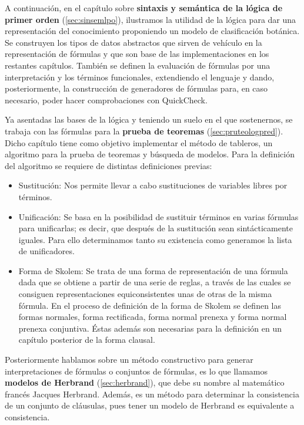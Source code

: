 A continuación, en el capítulo sobre \textbf{sintaxis y semántica de la lógica
de primer orden} (\ref{sec:sinsemlpo}), ilustramos la utilidad de la lógica
para dar una representación del conocimiento proponiendo un modelo de
clasificación botánica. Se construyen los tipos de datos abstractos que sirven
de vehículo en la representación de fórmulas y que son base de las
implementaciones en los restantes capítulos. También se definen la evaluación
de fórmulas por una interpretación y los términos funcionales, extendiendo el
lenguaje y dando, posteriormente, la construcción de generadores de fórmulas
para, en caso necesario, poder hacer comprobaciones con QuickCheck.

Ya asentadas las bases de la lógica y teniendo un suelo en el que sostenernos,
se trabaja con las fórmulas para la \textbf{prueba de teoremas}
(\ref{sec:pruteologpred}). Dicho capítulo tiene como objetivo implementar el
método de tableros, un algoritmo para la prueba de teoremas y búsqueda de
modelos. Para la definición del algoritmo se requiere de distintas definiciones
previas:

\begin{itemize}
\item Sustitución: Nos permite llevar a cabo sustituciones de variables libres
  por términos.
\item Unificación: Se basa en la posibilidad de sustituir términos en varias
  fórmulas para unificarlas; es decir, que después de la sustitución sean
  sintácticamente iguales. Para ello determinamos tanto su existencia como
  generamos la lista de unificadores.
\item Forma de Skolem: Se trata de una forma de representación de una fórmula
  dada que se obtiene a partir de una serie de reglas, a través de las cuales
  se consiguen representaciones equiconsistentes unas de otras de la misma
  fórmula. En el proceso de definición de la forma de Skolem se definen las
  formas normales, forma rectificada, forma normal prenexa y forma normal
  prenexa conjuntiva. Éstas además son necesarias para la definición en un
  capítulo posterior de la forma clausal.
\end{itemize}

Posteriormente hablamos sobre un método constructivo para generar
interpretaciones de fórmulas o conjuntos de fórmulas, es lo que llamamos
\textbf{modelos de Herbrand} (\ref{sec:herbrand}), que debe su nombre al
matemático francés Jacques Herbrand. Además, es un método para determinar la
consistencia de un conjunto de cláusulas, pues tener un modelo de Herbrand es
equivalente a consistencia.

